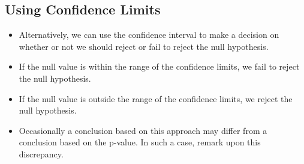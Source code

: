 \documentclass[a4paper,12pt]{article}
\begin{document}
\subsection*{Using Confidence Limits}
	\begin{itemize}
		\item Alternatively, we can use the confidence interval to make a decision on whether or not we should reject or fail to reject the null hypothesis.
		\item If the null value is within the range of the confidence limits, we fail to reject the null hypothesis.
		\item If the null value is outside the range of the confidence limits, we reject the null hypothesis.
		\item Occasionally a conclusion based on this approach may differ from a conclusion based on the p-value. In such a case, remark upon this discrepancy.
	\end{itemize}
	
	
\end{document}
